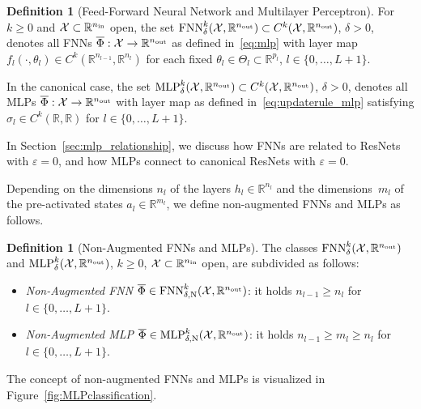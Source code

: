 \documentclass[10pt]{article}
\theoremstyle{definition}
\newtheorem{definition}[theorem]{Definition}
\numberwithin{equation}{section}
\newcommand{\eps}{\varepsilon}
\newcommand{\R}{\mathbb{R}}
\newcommand*{\nout}{n_\textup{out}}
\newcommand*{\nin}{n_\textup{in}}
\newcommand*{\MLP}{\textup{MLP}_{\delta}^k(\mathcal{X},\R^{\nout})}
\newcommand*{\FNN}{\textup{FNN}_{\delta}^k(\mathcal{X},\R^{\nout})}
\begin{document}
\begin{definition}[Feed-Forward Neural Network and Multilayer Perceptron] \label{def:feedforward}
	For $k \geq 0$ and $\mathcal{X}\subset \R^{\nin}$ open, the set $\FNN \subset C^k(\mathcal{X},\R^{\nout})$, $\delta>0$,  denotes all FNNs $\overline{\Phi}: \mathcal{X} \rightarrow \R^{\nout}$ as defined in~\eqref{eq:mlp} with layer map $f_l (\cdot,\theta_l)\in C^k(\R^{n_{l-1}},\R^{n_l})$ for each fixed $\theta_l \in \Theta_l \subset \R^{p_l}$, $l\in \{0,\ldots,L+1\}$. 

    In the canonical case, the set $\MLP \subset C^k(\mathcal{X},\R^{\nout})$, $\delta>0$, denotes all MLPs $\overline{\Phi}: \mathcal{X} \rightarrow \R^{\nout}$ with layer map as defined in~\eqref{eq:updaterule_mlp} satisfying $\sigma_l\in C^{k}(\R,\R)$ for $l \in \{0,\ldots,L+1\}$.
\end{definition}

In Section~\ref{sec:mlp_relationship}, we discuss how FNNs are related to ResNets with $\eps = 0$, and how MLPs connect to canonical ResNets with $\eps = 0$. \medskip

Depending on the dimensions $n_l$ of the layers $h_l \in \R^{n_l}$ and the dimensions~$m_l$ of the pre-activated states $a_l \in \R^{m_l}$, we define non-augmented FNNs and MLPs as follows.

\begin{definition}[Non-Augmented FNNs and MLPs] \label{def:mlp_classes}
	The classes $\FNN$ and $\MLP$, $k\geq 0$, $\mathcal{X}\subset \R^{\nin}$ open, are subdivided as follows:
	\begin{itemize}
		\item \emph{Non-Augmented FNN} $\overline{\Phi} \in \textup{FNN}^k_{\delta,\textup{N}}(\mathcal{X},\R^{\nout})$: it holds $n_{l-1} \geq n_{l} $ for $l \in \{0,\ldots, L+1\}$. 
        \item \emph{Non-Augmented MLP} $\overline{\Phi} \in \textup{MLP}^k_{\delta,\textup{N}}(\mathcal{X},\R^{\nout})$: it holds $n_{l-1} \geq m_{l} \geq n_{l} $ for $l \in \{0,\ldots, L+1\}$.
	\end{itemize}
\end{definition}

The concept of non-augmented FNNs and MLPs is visualized in Figure~\ref{fig:MLPclassification}. 
\end{document}
